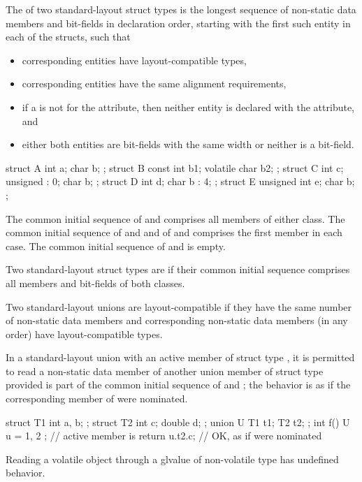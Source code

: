 \pnum
The  of two standard-layout struct
types is the longest sequence of non-static data
members and bit-fields in declaration order, starting with the first
such entity in each of the structs, such that
\begin{itemize}
\item
corresponding entities
have layout-compatible types,
\item
corresponding entities have the same alignment requirements,
\item
if a 
is not  for the  attribute,
then neither entity is declared with
the  attribute, and
\item
either both entities are bit-fields with the same width
or neither is a bit-field.
\end{itemize}
\begin{example}
\begin{codeblock}
struct A { int a; char b; };
struct B { const int b1; volatile char b2; };
struct C { int c; unsigned : 0; char b; };
struct D { int d; char b : 4; };
struct E { unsigned int e; char b; };
\end{codeblock}
The common initial sequence of  and  comprises all members
of either class. The common initial sequence of  and  and
of  and  comprises the first member in each case.
The common initial sequence of  and  is empty.
\end{example}

\pnum
Two standard-layout struct types are
 if
their common initial sequence comprises all members and bit-fields of
both classes.

\pnum
Two standard-layout unions are layout-compatible if they
have the same number of non-static data members and corresponding
non-static data members (in any order) have layout-compatible
types.

\pnum
In a standard-layout union with an active member
of struct type , it is permitted to read a non-static
data member  of another union member of struct type 
provided  is part of the common initial sequence of  and ;
the behavior is as if the corresponding member of  were nominated.
\begin{example}
\begin{codeblock}
struct T1 { int a, b; };
struct T2 { int c; double d; };
union U { T1 t1; T2 t2; };
int f() {
  U u = { { 1, 2 } };   // active member is 
  return u.t2.c;        // OK, as if  were nominated
}
\end{codeblock}
\end{example}
\begin{note}
Reading a volatile object through a glvalue of non-volatile type has
undefined behavior.
\end{note}

